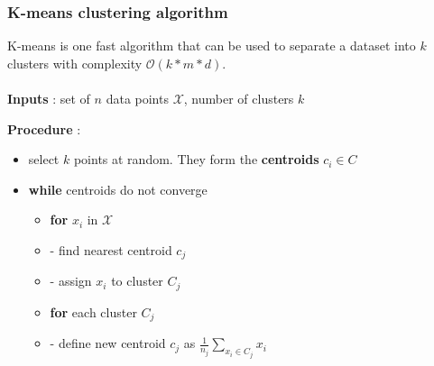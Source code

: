 \documentclass{beamer}
\begin{document}
\begin{frame}
  \frametitle{K-means clustering algorithm}
  K-means is one fast algorithm that can be used to separate a dataset into $k$
  clusters with complexity $\mathcal{O}(k*m*d)$.\\~\\

  \textbf{Inputs} : set of $n$ data points $\mathcal{X}$, number of clusters $k$

  \textbf{Procedure} :
  \begin{itemize}
    \item select $k$ points at random. They form the \textbf{centroids} $c_i \in
      C$
    \item \textbf{while} centroids do not converge
      \begin{itemize}
        \item \textbf{for} $x_i$ in $\mathcal{X}$
        \item[] - find nearest centroid $c_j$
        \item[] - assign $x_i$ to cluster $C_j$
      \end{itemize}
      \begin{itemize}
        \item \textbf{for} each cluster $C_j$
        \item[] - define new centroid $c_j$ as
                  $\frac{1}{n_j}\sum_{x_i \in C_j} x_i$
      \end{itemize}
  \end{itemize}
\end{frame}
\end{document}
